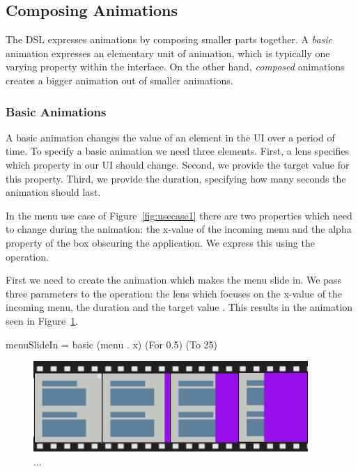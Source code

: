 \subsection{Composing Animations}

The DSL expresses animations by composing smaller parts together. A \emph{basic} animation expresses an elementary unit of animation, which is typically one varying property within the interface. On the other hand, \emph{composed} animations creates a bigger animation out of smaller animations.

\subsubsection{Basic Animations}

A basic animation changes the value of an element in the UI over a period of time. To specify a basic animation we need three elements. First, a lens specifies which property in our UI should change. Second, we provide the target value for this property. Third, we provide the duration, specifying how many seconds the animation should last.

In the menu use case of Figure~\ref{fig:usecase1} there are two properties which need to change during the animation: the x-value of the incoming menu and the alpha property of the box obscuring the application. We express this using the  operation.

First we need to create the animation which makes the menu slide in. We pass three parameters to the  operation: the lens  which focuses on the x-value of the incoming menu, the duration  and the target value . This results in the animation seen in Figure~\ref{fig:usecase1basic1}.

\begin{code}
menuSlideIn = basic (menu . x) (For 0.5) (To 25)
\end{code}

\begin{figure}[H]
\centering
\includegraphics[scale=0.4]{pictures/usecase1basic1.png}
\caption{...}
\label{fig:usecase1basic1}
\end{figure}

